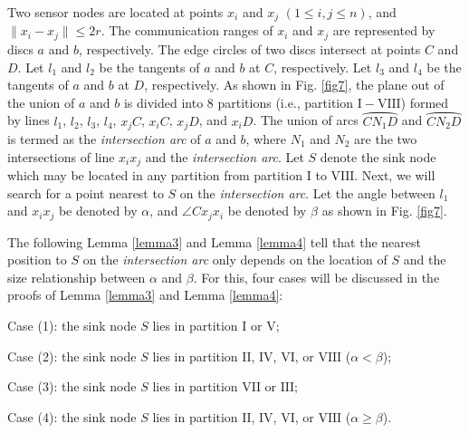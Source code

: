\documentclass[journal]{IEEEtran}
\begin{document}
Two sensor nodes are located at points $x_i$ and $x_j$ $(1\leq i,j\leq n)$, and $\|x_i-x_j\|\leq 2r$. The communication ranges of $x_i$
and $x_j$ are represented by discs $a$ and $b$, respectively. The edge circles of two discs intersect at points $C$ and $D$. Let $l_1$
and $l_2$ be the tangents of $a$ and $b$ at $C$, respectively. Let $l_3$ and $l_4$ be the tangents of $a$ and $b$ at $D$, respectively.
As shown in Fig. \ref{fig7}, the plane out of the union of $a$ and $b$ is divided into 8 partitions (i.e., partition $\mathrm{I-VIII}$) formed by lines
$l_1$, $l_2$, $l_3$, $l_4$, $x_jC$, $x_iC$, $x_jD$, and $x_iD$. The union of arcs $\wideparen{CN_1D}$ and $\wideparen{CN_2D}$ is termed as
the \emph{intersection arc} of $a$ and $b$, where $N_1$ and $N_2$ are the two intersections of line $x_ix_j$ and the \emph{intersection arc}.
Let $S$ denote the sink node which may be located in any partition from partition $\mathrm{I}$ to $\mathrm{VIII}$. Next, we will search for a point nearest to $S$ on the \emph{intersection arc}.
Let the angle between $l_1$ and $x_ix_j$ be denoted by $\alpha$, and $\angle Cx_jx_i$ be denoted by $\beta$ as shown in Fig. \ref{fig7}.

The following Lemma \ref{lemma3} and Lemma \ref{lemma4} tell that the nearest position to $S$ on the \emph{intersection arc} only depends on the location of $S$ and the size relationship between $\alpha$ and $\beta$. For this, four cases will be discussed in the proofs of Lemma \ref{lemma3} and Lemma \ref{lemma4}:

Case (1): the sink node $S$ lies in partition $\mathrm{I}$ or $\mathrm{V}$;

Case (2): the sink node $S$ lies in partition $\mathrm{II}$, $\mathrm{IV}$, $\mathrm{VI}$, or $\mathrm{VIII}$ ($\alpha < \beta$);

Case (3): the sink node $S$ lies in partition $\mathrm{VII}$ or $\mathrm{III}$;

Case (4): the sink node $S$ lies in partition $\mathrm{II}$, $\mathrm{IV}$, $\mathrm{VI}$, or $\mathrm{VIII}$ ($\alpha \geq\beta$).
\end{document}
